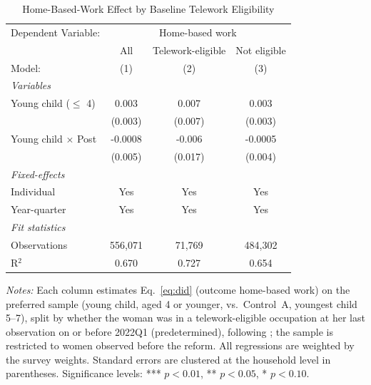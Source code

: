 
\begin{table}[H]
   \caption{\label{tab:mech_moderation} Home-Based-Work Effect by Baseline Telework Eligibility}
   \centering
\small\setlength{\tabcolsep}{5pt}
   \begin{tabular}{lccc}
      \toprule
      Dependent Variable: & \multicolumn{3}{c}{Home-based work}\\
                                 & All     & Telework-eligible & Not eligible \\   
      Model:                     & (1)     & (2)               & (3)\\  
      \midrule
      \emph{Variables}\\
      Young child ($\leq$ 4)     & 0.003   & 0.007             & 0.003\\   
                                 & (0.003) & (0.007)           & (0.003)\\   
\addlinespace[2pt]
      Young child $\times$ Post  & -0.0008 & -0.006            & -0.0005\\   
                                 & (0.005) & (0.017)           & (0.004)\\   
\addlinespace[2pt]
      \midrule
      \emph{Fixed-effects}\\
      Individual                 & Yes     & Yes               & Yes\\  
      Year-quarter               & Yes     & Yes               & Yes\\  
      \midrule
      \emph{Fit statistics}\\
      Observations               & 556,071 & 71,769            & 484,302\\  
      R$^2$                      & 0.670   & 0.727             & 0.654\\  
\bottomrule
   \end{tabular}
   
   \par \raggedright 
   \footnotesize\textit{Notes:} Each column estimates Eq.~\eqref{eq:did} (outcome home-based work) on the preferred sample (young child, aged 4 or younger, vs.\ Control~A, youngest child 5--7), split by whether the woman was in a telework-eligible occupation at her last observation on or before 2022Q1 (predetermined), following \citet{costa2024}; the sample is restricted to women observed before the reform. All regressions are weighted by the survey weights. Standard errors are clustered at the household level in parentheses. Significance levels: *** $p<0.01$, ** $p<0.05$, * $p<0.10$.
\end{table}


